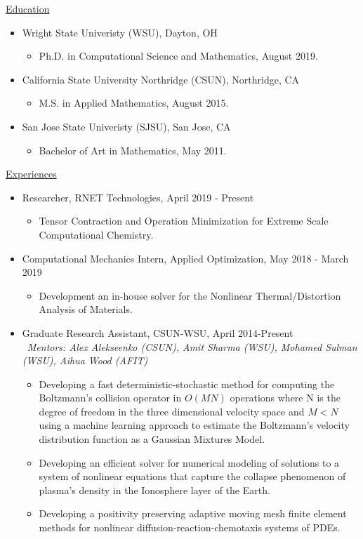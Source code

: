  {{\underline{Education}}}

  \begin{itemize}
\setlength{\itemsep}{0.2pt}
  \item Wright State Univeristy (WSU), Dayton, OH
\begin{itemize}
\item Ph.D. in Computational Science and Mathematics, August 2019.
\end{itemize}
  \item California State University Northridge (CSUN), Northridge, CA
\begin{itemize}
\item M.S. in Applied Mathematics, August 2015.
\end{itemize}
	\item San Jose State Univeristy (SJSU), San Jose, CA
\begin{itemize}
\item Bachelor of Art in Mathematics, May 2011. 
\end{itemize}
  \end{itemize}
  
{ {\underline{Experiences}}}
  
\begin{itemize}
\setlength{\itemsep}{0.2pt}
  
\item Researcher, RNET Technologies, April 2019 - Present
\begin{itemize}
\item Tensor Contraction and Operation Minimization for Extreme Scale Computational Chemistry.
\end{itemize}
\item Computational Mechanics Intern, Applied Optimization, May 2018 - March 2019
\begin{itemize}
\item Development an in-house solver for the Nonlinear Thermal/Distortion Analysis of Materials.
\end{itemize}
\item Graduate Research Assistant, CSUN-WSU, April 2014-Present\\\
{\em Mentors: Alex Alekseenko (CSUN), Amit Sharma (WSU), Mohamed Sulman (WSU), Aihua Wood (AFIT)}
\begin{itemize}
\item Developing a fast deterministic-stochastic method for computing the Boltzmann’s collision operator in $O(MN)$ operations where N is the degree of freedom in the three dimensional velocity space and $M < N$ using a machine learning approach to estimate the Boltzmann's velocity distribution function as a Gaussian Mixtures Model.
\item Developing an efficient solver for numerical modeling of solutions to a system of nonlinear equations that capture the collapse phenomenon of plasma’s density in the Ionosphere layer of the Earth.
\item Developing a positivity preserving adaptive moving mesh finite element methods for nonlinear diffusion-reaction-chemotaxis systems of PDEs.
\end{itemize}
\end{itemize}
  
